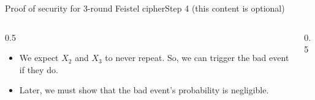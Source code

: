 \ifdefined\PRESENTATION\else\PassOptionsToClass{handout}{beamer}\fi\documentclass[aspectratio=169, lualatex]{beamer}
\begin{document}
	\begin{frame}{Proof of security for 3-round Feistel cipher}{Step 4 (this content is optional)}
		\begin{columns}[c]
			\begin{column}{0.5\textwidth}
				\begin{itemize}
					\item We expect $X_2$ and $X_3$ to never repeat. So, we can trigger the bad event if they do.
					\item Later, we must show that the bad event's probability is negligible.
				\end{itemize}
			\end{column}
			\begin{column}{0.5\textwidth}
				\vspace{-1.5cm}
				\begin{center}
				\end{center}
			\end{column}
		\end{columns}
	\end{frame}
\end{document}
